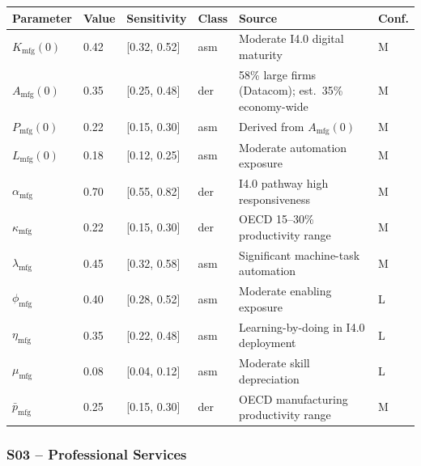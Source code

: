 \documentclass[11pt,a4paper]{article}
\begin{document}
\begin{center}
\begin{tabular}{llllll}
\toprule
Parameter & Value & Sensitivity & Class & Source & Conf.\\
\midrule
$K_{\text{mfg}}(0)$ & 0.42 & [0.32, 0.52] & asm & Moderate I4.0 digital maturity & M \\
$A_{\text{mfg}}(0)$ & 0.35 & [0.25, 0.48] & der & 58\% large firms (Datacom); est.\ 35\% economy-wide & M \\
$P_{\text{mfg}}(0)$ & 0.22 & [0.15, 0.30] & asm & Derived from $A_{\text{mfg}}(0)$ & M \\
$L_{\text{mfg}}(0)$ & 0.18 & [0.12, 0.25] & asm & Moderate automation exposure & M \\
$\alpha_{\text{mfg}}$ & 0.70 & [0.55, 0.82] & der & I4.0 pathway high responsiveness & M \\
$\kappa_{\text{mfg}}$ & 0.22 & [0.15, 0.30] & der & OECD 15--30\% productivity range & M \\
$\lambda_{\text{mfg}}$ & 0.45 & [0.32, 0.58] & asm & Significant machine-task automation & M \\
$\phi_{\text{mfg}}$ & 0.40 & [0.28, 0.52] & asm & Moderate enabling exposure & L \\
$\eta_{\text{mfg}}$ & 0.35 & [0.22, 0.48] & asm & Learning-by-doing in I4.0 deployment & L \\
$\mu_{\text{mfg}}$ & 0.08 & [0.04, 0.12] & asm & Moderate skill depreciation & L \\
$\bar{p}_{\text{mfg}}$ & 0.25 & [0.15, 0.30] & der & OECD manufacturing productivity range & M \\
\bottomrule
\end{tabular}
\end{center}

\subsubsection*{S03 -- Professional Services}
\end{document}
